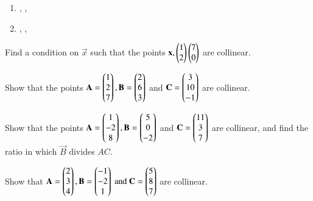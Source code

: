 \begin{enumerate}
\item {},  ,   
\item {},  ,   
\end{enumerate}
\item Find a condition on $\vec{x}$  such that the points $\mathbf{x}, \begin{pmatrix}1\\2\end{pmatrix}\begin{pmatrix}7\\0\end{pmatrix}$ are collinear.
\item Show that the points 
$\mathbf{A}=\begin{pmatrix}1\\2\\7\end{pmatrix}, \mathbf{B}=\begin{pmatrix}2\\6\\3\end{pmatrix}$ and $ \mathbf{C}=\begin{pmatrix}3\\10\\-1\end{pmatrix}$ are collinear.
\item Show that the points 
$\mathbf{A}=\begin{pmatrix}1\\-2\\8\end{pmatrix}, \mathbf{B}=\begin{pmatrix}5\\0\\-2\end{pmatrix}$ and $ \mathbf{C}=\begin{pmatrix}11\\3\\7\end{pmatrix}$ are collinear, and find the ratio in which $\vec{B}$ divides $AC$.
\item Show that 
$
\mathbf{A}=\begin{pmatrix}2\\3\\4\end{pmatrix}, 
\mathbf{B}=\begin{pmatrix}-1\\-2\\1\end{pmatrix} \text{ and } 
\mathbf{C}=\begin{pmatrix}5\\8\\7\end{pmatrix}$  
are collinear.

